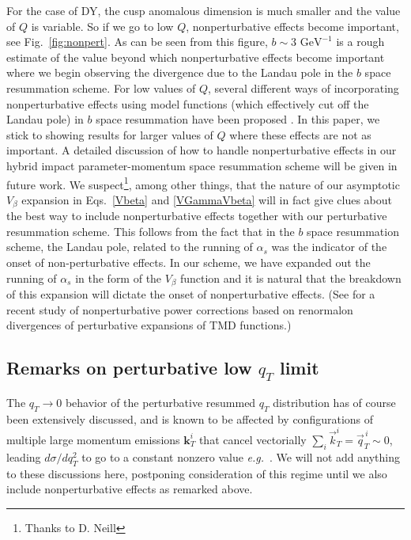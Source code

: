 \documentclass[a4,letterpaper,11pt]{article}
\newcommand{\vect}[1]{\mathbf{#1}}
\newcommand{\eg}{\emph{e.g.}~}
\newcommand{\eqs}[2]{Eqs.~\eqref{#1} and \eqref{#2}}
\newcommand{\fig}[1]{Fig.~\ref{fig:#1}}
\begin{document}
For the case of DY, the cusp anomalous dimension is much smaller and the value of $Q$ is variable. So if we go to low $Q$,  nonperturbative effects become important, see \fig{nonpert}. As can be seen from this figure, $b \sim 3\text{ GeV}^{-1}$ is a rough estimate of the value beyond which nonperturbative effects become important where we begin observing the divergence due to the Landau pole in the $b$ space resummation scheme. For low values of $Q$, several different ways of incorporating nonperturbative effects using model functions (which effectively cut off the Landau pole) in $b$ space resummation have been proposed \cite{Collins:2014jpa,Sun:2013dya,DAlesio:2014mrz,Scimemi:2017etj,Qiu:2000hf} . In this paper, we stick to showing results for larger values of $Q$ where these effects are not as important. A detailed discussion of how to handle nonperturbative effects in our hybrid impact parameter-momentum space resummation scheme will be given in future work. We suspect\footnote{Thanks to D. Neill}, among other things, that the nature of our asymptotic $V_\beta$ expansion in \eqs{Vbeta}{VGammaVbeta}  will in fact give clues about the best way to include nonperturbative effects together with our perturbative resummation scheme. This follows from the fact that in the $b$ space resummation scheme, the Landau pole, related to the running of $\alpha_s$  was the indicator of the onset of non-perturbative effects. In our scheme, we have expanded out the running of $\alpha_s$ in the form of the $V_{\beta}$ function and it is natural that the breakdown of this expansion will dictate the onset of nonperturbative effects. (See \cite{Scimemi:2016ffw} for a recent study of nonperturbative power corrections based on renormalon divergences of perturbative expansions of TMD functions.)


\subsection{Remarks on perturbative low $q_T$ limit}
\label{ssec:lowqT}

The $q_T\to 0$ behavior of the perturbative resummed $q_T$ distribution has of course been extensively discussed, and is known to be affected by configurations of multiple large momentum emissions $\vect{k}_T^i$ that cancel vectorially $\sum_i\vec{k}_T^i = \vec{q}_T^{\,i}\sim 0$, leading $d\sigma/dq_T^2$ to go to a constant nonzero value \eg \cite{Parisi:1979se,Becher:2011xn,Ebert:2016gcn,Bizon:2017rah}. We will not add anything to these discussions here, postponing consideration of this regime until we also include nonperturbative effects as remarked above. 
\end{document}
